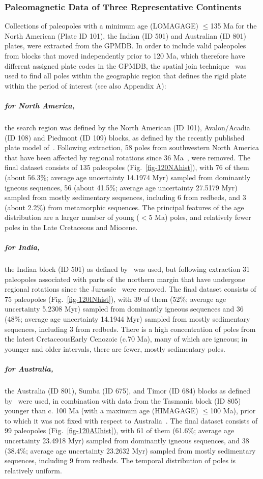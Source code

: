 \subsubsection{Paleomagnetic Data of Three Representative Continents}

Collections of paleopoles with a minimum age (LOMAGAGE) $\leq$135 Ma for the
North American (Plate ID 101), the Indian (ID 501) and Australian (ID 801)
plates, were extracted from the GPMDB\@. In order to include valid paleopoles
from blocks that moved independently prior to 120 Ma, which therefore have
different assigned plate codes in the GPMDB, the spatial join
technique~\cite{J07} was used to find all poles within the geographic region
that defines the rigid plate within the period of interest (see also Appendix
A):

\subparagraph{for North America,}
the search region was defined by the North American (ID 101), Avalon/Acadia (ID
108) and Piedmont (ID 109) blocks, as defined by the recently published plate
model of~\cite{Y18}. Following extraction, 58 poles from southwestern North
America that have been affected by regional rotations since 36 Ma~\cite{Mc06},
were removed. The final dataset consists of 135 paleopoles
(Fig.~\ref{fig-120NAhist}), with 76 of them (about 56.3\%; average age
uncertainty 14.1974 Myr) sampled from dominantly igneous sequences, 56 (about
41.5\%; average age uncertainty 27.5179 Myr) sampled from mostly sedimentary
sequences, including 6 from redbeds, and 3 (about 2.2\%) from metamorphic
sequences. The principal features of the age distribution are a larger number of
young ($<$5 Ma) poles, and relatively fewer poles in the Late Cretaceous and
Miocene.

\subparagraph{for India,}
the Indian block (ID 501) as defined by~\cite{Y18} was used, but following
extraction 31 paleopoles associated with parts of the northern margin that
have undergone regional rotations since the Jurassic~\cite{G15} were removed.
The final dataset consists of 75 paleopoles (Fig.~\ref{fig-120INhist}), with
39 of them (52\%; average age uncertainty 5.2308 Myr) sampled from dominantly
igneous sequences and 36 (48\%; average age uncertainty 14.1944 Myr) sampled
from mostly sedimentary sequences, including 3 from redbeds. There is a high
concentration of poles from the latest Cretaceous\textendash{}Early Cenozoic
(c.70 Ma), many of which are igneous; in younger and older
intervals, there are fewer, mostly sedimentary poles.

\subparagraph{for Australia,}
the Australia (ID 801), Sumba (ID 675), and Timor (ID 684) blocks as defined
by~\cite{Y18} were used, in combination with data from the Tasmania block (ID
805) younger than c. 100 Ma (with a maximum age (HIMAGAGE) $\leq$100 Ma), prior
to which it was not fixed with respect to Australia~\cite{Y18}. The final
dataset consists of 99 paleopoles (Fig.~\ref{fig-120AUhist}), with 61 of them
(61.6\%; average age uncertainty 23.4918 Myr) sampled from dominantly igneous
sequences, and 38 (38.4\%; average age uncertainty 23.2632 Myr) sampled from
mostly sedimentary sequences, including 9 from redbeds. The temporal
distribution of poles is relatively uniform.

